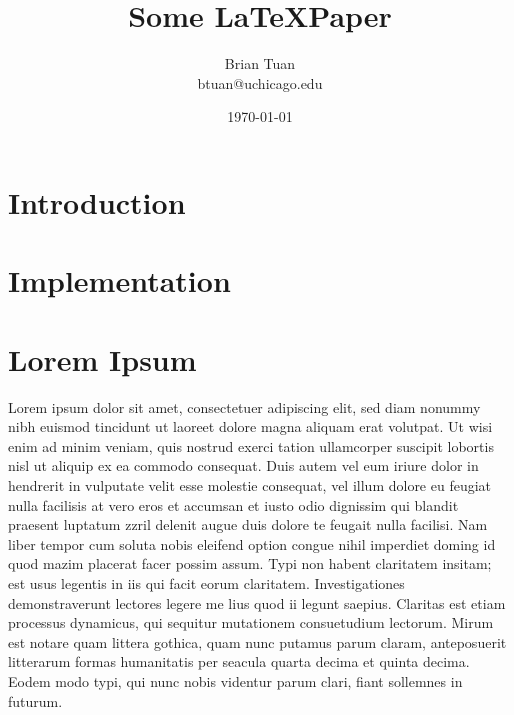 \documentclass[letterpaper, 10pt, twocolumn]{article}
\title{Some \LaTeX Paper}
\author{
	Brian Tuan\\
	btuan@uchicago.edu
}
\date{ }
\begin{document}
 

\thispagestyle{empty}
\begin{titlepage}
	\vspace*{1.5in}
	{\let\newpage\relax\maketitle}	
	
	\centering
	\large{\date{\today}}
	\vspace{2in}

	\begin{abstract}
		
	\end{abstract}

	\thispagestyle{empty}
	\setcounter{page}{0}
\end{titlepage}

\newpage
\section{Introduction}
	

\section{Implementation}
    

\section{Lorem Ipsum}
Lorem ipsum dolor sit amet, consectetuer adipiscing elit, sed diam nonummy nibh euismod tincidunt ut laoreet dolore magna aliquam erat volutpat. Ut wisi enim ad minim veniam, quis nostrud exerci tation ullamcorper suscipit lobortis nisl ut aliquip ex ea commodo consequat. Duis autem vel eum iriure dolor in hendrerit in vulputate velit esse molestie consequat, vel illum dolore eu feugiat nulla facilisis at vero eros et accumsan et iusto odio dignissim qui blandit praesent luptatum zzril delenit augue duis dolore te feugait nulla facilisi. Nam liber tempor cum soluta nobis eleifend option congue nihil imperdiet doming id quod mazim placerat facer possim assum. Typi non habent claritatem insitam; est usus legentis in iis qui facit eorum claritatem. Investigationes demonstraverunt lectores legere me lius quod ii legunt saepius. Claritas est etiam processus dynamicus, qui sequitur mutationem consuetudium lectorum. Mirum est notare quam littera gothica, quam nunc putamus parum claram, anteposuerit litterarum formas humanitatis per seacula quarta decima et quinta decima. Eodem modo typi, qui nunc nobis videntur parum clari, fiant sollemnes in futurum.
\end{document}
